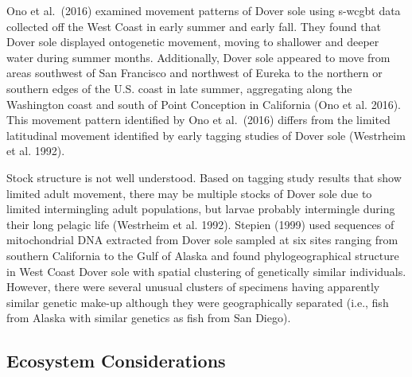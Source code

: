 \documentclass[11pt,
  english,
  a4paper,
]{article}
\begin{document}
Ono et al.~{(2016)\leavevmode\tagmcend\tagstructend} examined movement patterns of Dover sole using \gls{s-wcgbt} data collected off the West Coast in early summer and early fall. They found that Dover sole displayed ontogenetic movement, moving to shallower and deeper water during summer months. Additionally, Dover sole appeared to move from areas southwest of San Francisco and northwest of Eureka to the northern or southern edges of the U.S. coast in late summer, aggregating along the Washington coast and south of Point Conception in California {(Ono et al. 2016)\leavevmode\tagmcend\tagstructend}. This movement pattern identified by Ono et al.~{(2016)\leavevmode\tagmcend\tagstructend} differs from the limited latitudinal movement identified by early tagging studies of Dover sole {(Westrheim et al. 1992)\leavevmode\tagmcend\tagstructend}.

\leavevmode\tagmcend\tagstructend\par


Stock structure is not well understood. Based on tagging study results that show limited adult movement, there may be multiple stocks of Dover sole due to limited intermingling adult populations, but larvae probably intermingle during their long pelagic life {(Westrheim et al. 1992)\leavevmode\tagmcend\tagstructend}. Stepien {(1999)\leavevmode\tagmcend\tagstructend} used sequences of mitochondrial DNA extracted from Dover sole sampled at six sites ranging from southern California to the Gulf of Alaska and found phylogeographical structure in West Coast Dover sole with spatial clustering of genetically similar individuals. However, there were several unusual clusters of specimens having apparently similar genetic make-up although they were geographically separated (i.e., fish from Alaska with similar genetics as fish from San Diego).

\leavevmode\tagmcend\tagstructend\par


\hypertarget{ecosystem-considerations-1}{%
\subsection{Ecosystem Considerations}\label{ecosystem-considerations-1}}
\end{document}
